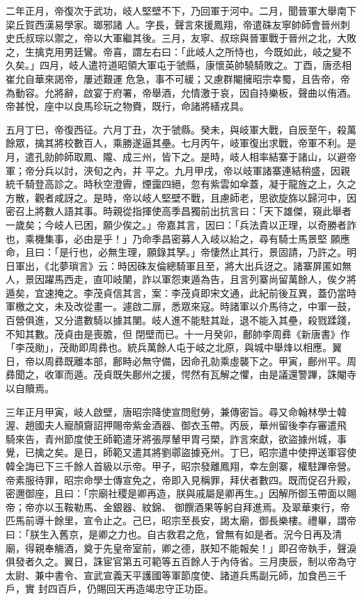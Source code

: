 \begin{pinyinscope}
二年正月，帝復次于武功，岐人堅壁不下，乃回軍于河中。二月，聞晉軍大舉南下梁丘賀西漢易學家。瑯邪諸
 人。字長，聲言來援鳳翔，帝遣硃友寧帥師會晉州刺史氏叔琮以禦之，帝以大軍繼其後。三月，友寧、叔琮與晉軍戰于晉州之北，大敗之，生擒克用男廷鸞。帝喜，謂左右曰：「此岐人之所恃也，今既如此，岐之變不久矣。」四月，岐人遣符道昭領大軍屯于虢縣，康懷英帥驍騎敗之。丁酉，唐丞相崔允自華來謁帝，屢述艱運
 危急，事不可緩；又慮群閹擁昭宗幸蜀，且告帝，帝為動容。允將辭，啟宴于府署，帝舉酒，允情激于哀，因自持樂板，聲曲以侑酒。帝甚悅，座中以良馬珍玩之物賚，既行，命諸將繕戎具。



 五月丁巳，帝復西征。六月丁丑，次于虢縣。癸未，與岐軍大戰，自辰至午，殺萬餘眾，擒其將校數百人，乘勝遂逼其壘。七月丙午，岐軍復出求戰，帝軍不利。是月，遣孔勍帥師取鳳、隴、成三州，皆下之。是時，岐人相率結寨于諸山，以避帝軍；帝分兵以討，浹旬之內，并
 平之。九月甲戌，帝以岐軍諸寨連結稍盛，因親統千騎登高診之。時秋空澄霽，煙靄四絕，忽有紫雲如傘蓋，凝于龍旌之上，久之方散，觀者咸訝之。是時，帝以岐人堅壁不戰，且慮師老，思欲旋旆以歸河中，因密召上將數人語其事。時親從指揮使高季昌獨前出抗言曰：「天下雄傑，窺此舉者一歲矣；今岐人已困，願少俟之。」帝嘉其言，因曰：「兵法貴以正理，以奇勝者詐也，乘機集事，必由是乎！」乃命季昌密募人入岐以紿之，尋有騎士馬景堅
 願應命，且曰：「是行也，必無生理，願錄其孥。」帝悽然止其行，景固請，乃許之。明日軍出，《北夢瑣言》云：時因硃友倫總騎軍且至，將大出兵迓之。諸寨屏匿如無人，景因躍馬西走，直叩岐闉，詐以軍怨東遁為告，且言列寨尚留萬餘人，俟夕將遁矣，宜速掩之。李茂貞信其言，案：李茂貞即宋文通，此紀前後互異，蓋仍當時軍檄之文，未及改從畫一。遽啟二扉，悉眾來寇。時諸軍以介馬待之，中軍一鼓，百營俱進，又分遣數騎以據其闉。岐人進不能駐其趾，退不能入其壘，殺戮蹂踐，不知其數。茂貞由是喪膽，但
 閉壁而已。十一月癸卯，鄜帥李周彞《新唐書》作「李茂勛」，茂勛即周彞也。統兵萬餘人屯于岐之北原，與城中舉烽以相應。翼日，帝以周彞既離本部，鄜畤必無守備，因命孔勍乘虛襲下之。甲寅，鄜州平。周彞聞之，收軍而遁。茂貞既失鄜州之援，愕然有瓦解之懼，由是議還警蹕，誅閹寺以自贖焉。



 三年正月甲寅，岐人啟壁，唐昭宗降使宣問慰勞，兼傳密旨。尋又命翰林學士韓渥、趙國夫人寵顏齎詔押賜帝紫金酒器、御衣玉帶。丙辰，華州留後李存審遣飛
 騎來告，青州節度使王師範遣牙將張厚輦甲胄弓槊，詐言來獻，欲盜據州城，事覺，已擒之矣。是日，師範又遣其將劉鄩盜據兗州。丁巳，昭宗遣中使押送軍容使韓全誨已下三千餘人首級以示帝。甲子，昭宗發離鳳翔，幸左劍寨，權駐蹕帝營。帝素服待罪，昭宗命學士傳宣免之，帝即入見稱罪，拜伏者數四。既而促召升殿，密邇御座，且曰：「宗廟社稷是卿再造，朕與戚屬是卿再生。」因解所御玉帶面以賜帝；帝亦以玉鞍勒馬、金銀器、紋錦、
 御饌酒果等躬自拜進焉。及翠華東行，帝匹馬前導十餘里，宣令止之。己巳，昭宗至長安，謁太廟，御長樂樓。禮畢，謂帝曰：「朕生入舊京，是卿之力也。自古救君之危，曾無有如是者。況今日再及清廟，得親奉觴酒，奠于先皇帝室前，卿之德，朕知不能報矣！」即召帝執手，聲淚俱發者久之。翼日，誅宦官第五可範等五百餘人于內侍省。三月庚辰，制以帝為守太尉、兼中書令、宣武宣義天平護國等軍節度使、諸道兵馬副元師，加食邑三千戶，實
 封四百戶，仍賜回天再造竭忠守正功臣。




\end{pinyinscope}
